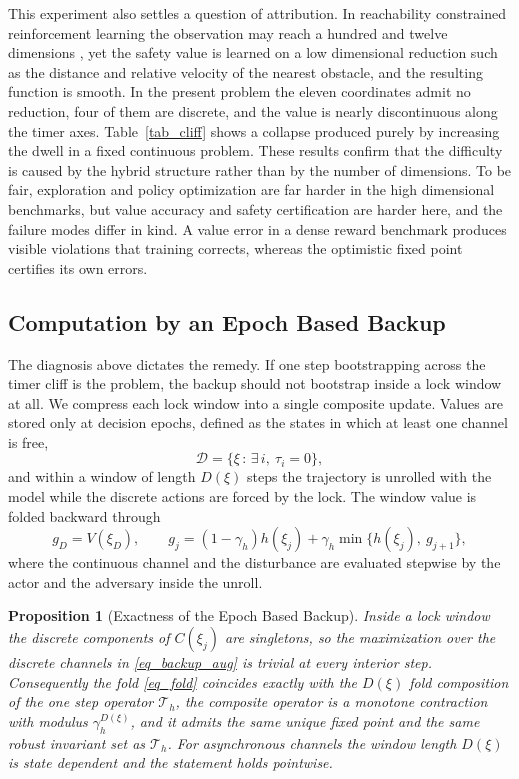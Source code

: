 \documentclass[journal]{IEEEtran}
\newtheorem{proposition}{Proposition}
\begin{document}
This experiment also settles a question of attribution. In reachability constrained reinforcement learning the observation may reach a hundred and twelve dimensions \cite{yu2022}, yet the safety value is learned on a low dimensional reduction such as the distance and relative velocity of the nearest obstacle, and the resulting function is smooth. In the present problem the eleven coordinates admit no reduction, four of them are discrete, and the value is nearly discontinuous along the timer axes. Table~\ref{tab_cliff} shows a collapse produced purely by increasing the dwell in a fixed continuous problem. These results confirm that the difficulty is caused by the hybrid structure rather than by the number of dimensions. To be fair, exploration and policy optimization are far harder in the high dimensional benchmarks, but value accuracy and safety certification are harder here, and the failure modes differ in kind. A value error in a dense reward benchmark produces visible violations that training corrects, whereas the optimistic fixed point certifies its own errors.

\subsection{Computation by an Epoch Based Backup}\label{subsec_macro}

The diagnosis above dictates the remedy. If one step bootstrapping across the timer cliff is the problem, the backup should not bootstrap inside a lock window at all. We compress each lock window into a single composite update. Values are stored only at decision epochs, defined as the states in which at least one channel is free,
\begin{equation}
\mathcal{D} = \{\xi \,:\, \exists\, i,\ \tau_i = 0\},
\end{equation}
and within a window of length $D(\xi)$ steps the trajectory is unrolled with the model while the discrete actions are forced by the lock. The window value is folded backward through
\begin{equation}
g_{D} = V(\xi_{D}), \qquad
g_{j} = (1-\gamma_h) h(\xi_j) + \gamma_h \min\{ h(\xi_j),\ g_{j+1} \},
\label{eq_fold}
\end{equation}
where the continuous channel and the disturbance are evaluated stepwise by the actor and the adversary inside the unroll.

\begin{proposition}[Exactness of the Epoch Based Backup]\label{prop_macro}
Inside a lock window the discrete components of $C(\xi_j)$ are singletons, so the maximization over the discrete channels in \eqref{eq_backup_aug} is trivial at every interior step. Consequently the fold \eqref{eq_fold} coincides exactly with the $D(\xi)$ fold composition of the one step operator $\mathcal{T}_h$, the composite operator is a monotone contraction with modulus $\gamma_h^{D(\xi)}$, and it admits the same unique fixed point and the same robust invariant set as $\mathcal{T}_h$. For asynchronous channels the window length $D(\xi)$ is state dependent and the statement holds pointwise.
\end{proposition}
\end{document}
